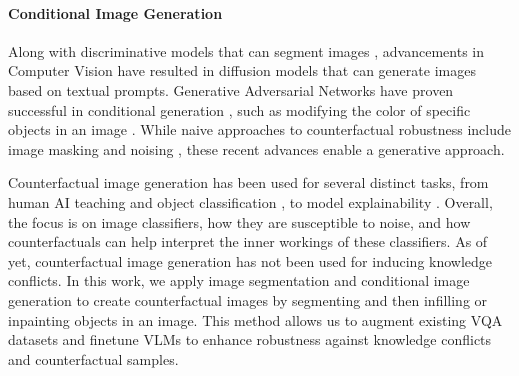 




\paragraph{Conditional Image Generation}
Along with discriminative models that can segment images \citep{ravi_sam_2024,liu_grounding_2024}, advancements in Computer Vision have resulted in diffusion models that can generate images \citep{rombach_high-resolution_2022} based on textual prompts. Generative Adversarial Networks have proven successful in conditional generation \citep{lu_cigli_2021}, such as modifying the color of specific objects in an image \citep{khodadadeh2021automatic}. While naive approaches to counterfactual robustness include image masking \citep{chen2020counterfactual} and noising \citep{ishmam2024visual}, these recent advances enable a generative approach.

Counterfactual image generation has been used for several distinct tasks, from human AI teaching \citep{goyal_counterfactual_nodate} and object classification \citep{sauer_counterfactual_2021}, to model explainability \citep{vermeire_explainable_2022,chang_explaining_2019}. Overall, the focus is on image classifiers, how they are susceptible to noise, and how counterfactuals can help interpret the inner workings of these classifiers. As of yet, counterfactual image generation has not been used for inducing knowledge conflicts. In this work, we apply image segmentation \citep{yu_inpaint_2023,rombach_high-resolution_2022,suvorov_resolution-robust_2022} and conditional image generation to create counterfactual images by segmenting and then infilling or inpainting objects in an image. This method allows us to augment existing VQA datasets and finetune VLMs to enhance robustness against knowledge conflicts and counterfactual samples.

